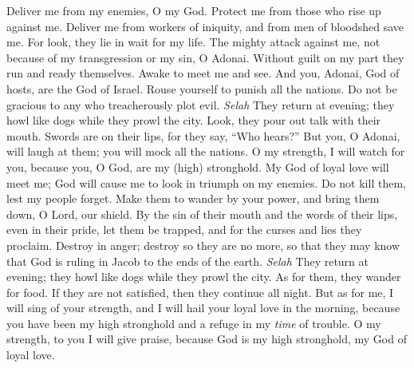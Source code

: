 \begin{biblechapter} %
 Deliver me from my enemies, O my God. 
Protect me from those who rise up against me.
\verse Deliver me from workers of iniquity, 
and from men of bloodshed save me.
\verse For look, they lie in wait for my life. 
The mighty attack against me, 
not because of my transgression or my sin, O Adonai.
\verse Without guilt on my part they run and ready themselves. 
Awake to meet me and see.
\verse And you, Adonai, God of hosts, are the God of Israel. 
Rouse yourself to punish all the nations. 
Do not be gracious to any who treacherously plot evil. \textit{Selah}
\verse They return at evening; they howl like dogs 
while they prowl the city.
\verse Look, they pour out talk with their mouth. 
Swords are on their lips, 
for they say, “Who hears?”
\verse But you, O Adonai, will laugh at them; 
you will mock all the nations.
\verse O my strength, I will watch for you, 
because you, O God, are my (high) stronghold.
\verse My God of loyal love will meet me; 
God will cause me to look in triumph on my enemies.
\verse Do not kill them, lest my people forget. 
Make them to wander by your power, 
and bring them down, O Lord, our shield.
\verse By the sin of their mouth and the words of their lips, 
even in their pride, let them be trapped, 
and for the curses and lies they proclaim.
\verse Destroy in anger; destroy so they are no more, 
so that they may know that God is ruling in Jacob 
to the ends of the earth. \textit{Selah}
\verse They return at evening; they howl like dogs 
while they prowl the city.
\verse As for them, they wander for food. 
If they are not satisfied, then they continue all night.
\verse But as for me, I will sing of your strength, 
and I will hail your loyal love in the morning, 
because you have been my high stronghold 
and a refuge in my \textit{time} of trouble.
\verse O my strength, to you I will give praise, 
because God is my high stronghold, 
my God of loyal love.
\end{biblechapter}


